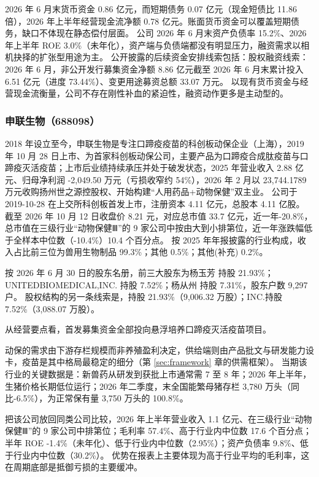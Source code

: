  2026 年 6 月末货币资金 0.86 亿元，而短期债务 0.07 亿元（现金短债比 11.86 倍），2026 年上半年经营现金流净额 0.78 亿元。账面货币资金可以覆盖短期债务，缺口不体现在静态偿付层面。 公司 2026 年 6 月末资产负债率 15.2\%、2026 年上半年 ROE 3.0\%（未年化），资产端与负债端都没有明显压力，融资需求以相机抉择的扩张型用途为主。 公开披露的后续资金安排线索包括：股权融资线索：2026 年 6 月，非公开发行募集资金净额 8.86 亿元截至 2026 年 6 月末累计投入 6.51 亿元（进度 73.44\%）、变更用途募资总额 33.07 万元。 以现有货币资金与经营现金流衡量，公司不存在刚性补血的紧迫性，融资动作更多是主动型的。




\subsubsection{申联生物（688098）}
\label{co:688098}

 2018 年设立至今，申联生物是专注口蹄疫疫苗的科创板动保企业（上海），2019 年 10 月 28 日上市、为首家科创板动保公司，主要产品为口蹄疫合成肽疫苗与口蹄疫灭活疫苗；上市后业绩持续承压并处于破发状态，2025 年营业收入 2.88 亿元、归母净利润 -2,049.50 万元（亏损收窄约 54\%），2026 年 2 月以 23,744.1789 万元收购扬州世之源控股权、开始构建“人用药品+动物保健”双主业。 公司于 2019-10-28 在上交所科创板首发上市，注册资本 4.11 亿元，总股本 4.11 亿股。 截至 2026 年 10 月 12 日收盘价 8.21 元，对应总市值 33.7 亿元，近一年-20.8\%，总市值在三级行业“动物保健Ⅲ”的 9 家公司中按由大到小排第位，近一年涨跌幅低于全样本中位数（-10.4\%）10.4 个百分点。 按 2025 年年报披露的行业构成，收入占比前三位为兽用生物制品 99.3\%；其他 0.5\%；其他(补充) 0.2\%。

 按 2026 年 6 月 30 日的股东名册，前三大股东为杨玉芳 持股 21.93\%；UNITEDBIOMEDICAL,INC. 持股 7.52\%；杨从州 持股 7.31\%，股东户数 9,297 户。 股权结构的另一条线索是，持股 21.93\%（9,006.32 万股）；INC.持股 7.52\%（3,088.07 万股）。

 从经营要点看，首发募集资金全部投向悬浮培养口蹄疫灭活疫苗项目。

 动保的需求由下游存栏规模而非养殖盈利决定，供给端则由产品批文与研发能力设卡，疫苗是其中格局最稳定的细分（第 \ref{sec:framework} 章的供需框架）。 当期该行业的关键数据是：新兽药从研发到获批上市通常需 7 至 8 年；2026 年上半年，生猪价格长期低位运行；2026 年二季度，末全国能繁母猪存栏 3,780 万头（同比-6.5\%），为正常保有量 3,750 万头的 100.8\%。

 把该公司放回同类公司比较，2026 年上半年营业收入 1.1 亿元、在三级行业“动物保健Ⅲ”的 9 家公司中排第位；毛利率 57.4\%、高于行业内中位数 17.6 个百分点；半年 ROE -1.4\%（未年化）、低于行业内中位数（2.95\%）；资产负债率 9.8\%、低于行业内中位数（30.2\%）。 优势在报表上主要体现为高于行业平均的毛利率，这在周期底部是抵御亏损的主要缓冲。


